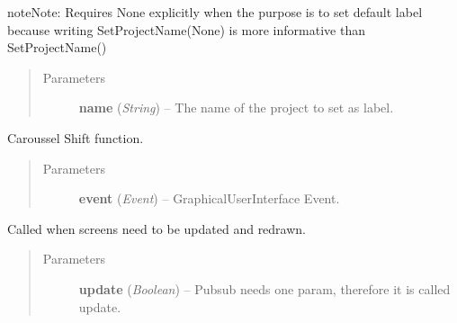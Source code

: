 \documentclass[letterpaper,10pt,english]{sphinxmanual}
\begin{document}
\begin{fulllineitems}
\begin{fulllineitems}
\begin{notice}{note}{Note:}
Requires None explicitly when the purpose is to set default label
because writing SetProjectName(None) is more informative than
SetProjectName()
\end{notice}
\begin{quote}\begin{description}
\item[{Parameters}] \leavevmode
\textbf{name} (\emph{String}) -- The name of the project to set as label.

\end{description}\end{quote}

\end{fulllineitems}


\begin{fulllineitems}
\label{diwacs:diwacs.GraphicalUserInterface.Shift}
Caroussel Shift function.
\begin{quote}\begin{description}
\item[{Parameters}] \leavevmode
\textbf{event} (\emph{Event}) -- GraphicalUserInterface Event.

\end{description}\end{quote}

\end{fulllineitems}


\begin{fulllineitems}
\label{diwacs:diwacs.GraphicalUserInterface.UpdateScreens}
Called when screens need to be updated and redrawn.
\begin{quote}\begin{description}
\item[{Parameters}] \leavevmode
\textbf{update} (\emph{Boolean}) -- Pubsub needs one param, therefore it is called update.

\end{description}\end{quote}

\end{fulllineitems}


\end{fulllineitems}
\end{document}
